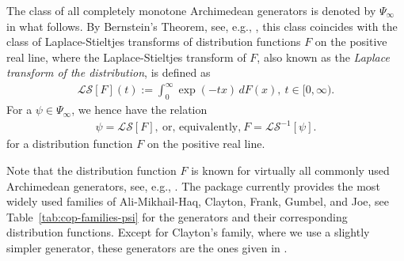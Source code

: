 \documentclass[nojss,article]{jss}
\theoremstyle{mythmstyle}
\newcommand*{\LS}{\mathcal{LS}}
\newcommand*{\LSi}{\LS^{-1}}
\begin{document}
The class of all completely monotone Archimedean generators is denoted by
$\Psi_\infty$ in what follows. By Bernstein's Theorem, see, e.g.,
\citet[p.\ 439]{feller1971}, this class coincides with the class of
Laplace-Stieltjes transforms of distribution functions $F$ on the positive
real line, where the Laplace-Stieltjes transform of $F$, also known as the
\textit{Laplace transform of the distribution}, %
is defined as
\begin{align*}
  \LS[F](t):=\int_0^\infty\exp(-tx)\,dF(x),\ t\in[0,\infty).
\end{align*}
For a $\psi\in\Psi_\infty$, we hence have the relation
\begin{align*}
  \psi=\LS[F],\ \text{or, equivalently,}\ F=\LSi[\psi].
\end{align*}
for a distribution function $F$ on the positive real line.

Note that the distribution function $F$ is known for virtually all commonly
used Archimedean generators, see, e.g., \citet[p.\ 62]{hofert2010c}. The
package  currently provides the most widely used families of
Ali-Mikhail-Haq, Clayton, Frank, Gumbel, and Joe, see Table~\ref{tab:cop-families-psi}
for the generators and their corresponding distribution functions. Except
for Clayton's family, where we use a slightly simpler generator, these
generators are the ones given in \citet[pp.\ 116]{nelsen2007}.
\end{document}
